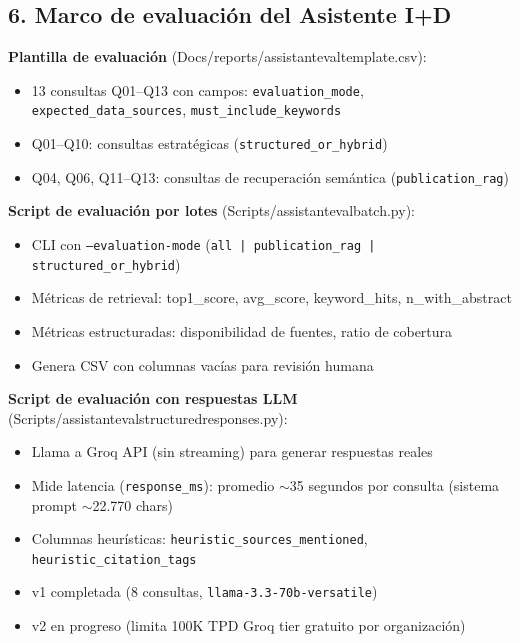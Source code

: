 \documentclass[12pt,a4paper]{report}
\newcommand{\filebreak}{\char95\allowbreak}
\newcommand{\file}[1]{{\color{cchenblue}\ttfamily\let\_\filebreak #1}}
\begin{document}
\subsection*{6. Marco de evaluación del Asistente I+D}

\textbf{Plantilla de evaluación} (\file{Docs/reports/assistant\_eval\_template.csv}):
\begin{itemize}
  \item 13 consultas Q01--Q13 con campos: \texttt{evaluation\_mode}, \texttt{expected\_data\_sources}, \texttt{must\_include\_keywords}
  \item Q01--Q10: consultas estratégicas (\texttt{structured\_or\_hybrid})
  \item Q04, Q06, Q11--Q13: consultas de recuperación semántica (\texttt{publication\_rag})
\end{itemize}

\textbf{Script de evaluación por lotes} (\file{Scripts/assistant\_eval\_batch.py}):
\begin{itemize}
  \item CLI con \texttt{--evaluation-mode} (\texttt{all | publication\_rag | structured\_or\_hybrid})
  \item Métricas de retrieval: top1\_score, avg\_score, keyword\_hits, n\_with\_abstract
  \item Métricas estructuradas: disponibilidad de fuentes, ratio de cobertura
  \item Genera CSV con columnas vacías para revisión humana
\end{itemize}

\textbf{Script de evaluación con respuestas LLM}\\ (\file{Scripts/assistant\_eval\_structured\_responses.py}):
\begin{itemize}
  \item Llama a Groq API (sin streaming) para generar respuestas reales
  \item Mide latencia (\texttt{response\_ms}): promedio $\sim$35 segundos por consulta (sistema prompt $\sim$22.770 chars)
  \item Columnas heurísticas: \texttt{heuristic\_sources\_mentioned}, \texttt{heuristic\_citation\_tags}
  \item v1 completada (8 consultas, \texttt{llama-3.3-70b-versatile})
  \item v2 en progreso (limita 100K TPD Groq tier gratuito por organización)
\end{itemize}
\end{document}
